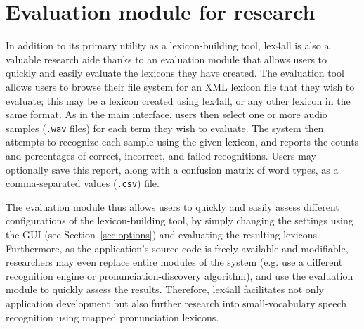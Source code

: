\documentclass[11pt]{article}
\begin{document}



\section{Evaluation module for research}
\label{sec:evaluation}

In addition to its primary utility as a lexicon-building tool, lex4all is also a valuable research aide thanks to an evaluation module that allows users to quickly and easily evaluate the lexicons they have created. The evaluation tool allows users to browse their file system for an XML lexicon file that they wish to evaluate; this may be a lexicon created using lex4all, or any other lexicon in the same format. 
As in the main interface, users then select one or more audio samples (\texttt{.wav} files) for each term they wish to evaluate.
The system then attempts to recognize each sample using the given lexicon, and reports the counts and percentages
of correct, incorrect, and failed recognitions.
Users may optionally save this report, along with a confusion matrix of word types, as a comma-separated values (\texttt{.csv}) file.

The evaluation module thus allows users to quickly and easily assess different configurations of the lexicon-building tool, by simply changing the settings using the GUI (see Section~\ref{sec:options}) and evaluating the resulting lexicons. Furthermore, as the application's source code is freely available and modifiable, researchers may even replace entire modules of the system 
(e.g. use a 
different recognition engine or 
pronunciation-discovery algorithm), and use the evaluation module to quickly assess the results. 
Therefore, lex4all facilitates not only application development but also further research into small-vocabulary speech recognition using mapped pronunciation lexicons.
\end{document}
